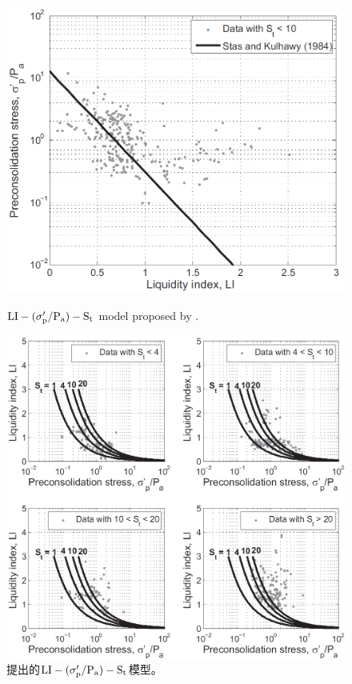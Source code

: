 \begin{figure}[!p]
    \centering
    \begin{minipage}[t]{0.48\textwidth}
        \centering
        \includegraphics[width=\textwidth]{figures/figure-6.png}
        \caption{$\rm{LI}-(\sigma_p'/P_a)-S_t$ model proposed by \citet{Stas1984}.}
        \vspace{-5pt}
        \addtocounter{figure}{-1}
        \renewcommand{\figurename}{图}
        \caption{\citet{Stas1984}提出的$\rm{LI}-(\sigma_p'/P_a)-S_t$模型。}
        \label{figure:6}
        \renewcommand{\figurename}{Figure}
    \end{minipage}
    \begin{minipage}[t]{0.48\textwidth}
        \centering
        \includegraphics[width=\textwidth]{figures/figure-7.png}

\end{minipage}
\end{figure}
